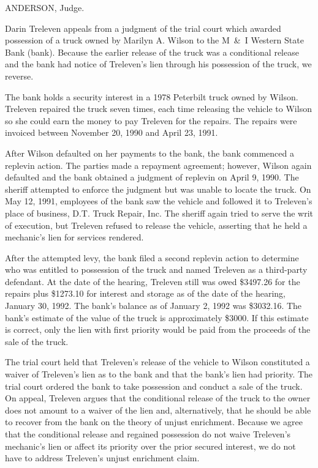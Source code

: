 
ANDERSON, Judge.

Darin Treleven appeals from a judgment of the trial court which awarded
possession of a truck owned by Marilyn A. Wilson to the M~\&~I Western State
Bank (bank). Because the earlier release of the truck was a conditional release
and the bank had notice of Treleven's lien through his possession of the truck,
we reverse.

The bank holds a security interest in a 1978 Peterbilt truck owned by Wilson.
Treleven repaired the truck seven times, each time releasing the vehicle to
Wilson so she could earn the money to pay Treleven for the repairs. The repairs
were invoiced between November 20, 1990 and April 23, 1991.

After Wilson defaulted on her payments to the bank, the bank commenced a
replevin action. The parties made a repayment agreement; however, Wilson again
defaulted and the bank obtained a judgment of replevin on April 9, 1990. The
sheriff attempted to enforce the judgment but was unable to locate the truck.
On May 12, 1991, employees of the bank saw the vehicle and followed it to
Treleven's place of business, D.T. Truck Repair, Inc. The sheriff again tried
to serve the writ of execution, but Treleven refused to release the vehicle,
asserting that he held a mechanic's lien for services rendered.

After the attempted levy, the bank filed a second replevin action to determine
who was entitled to possession of the truck and named Treleven as a third-party
defendant. At the date of the hearing, Treleven still was owed \$3497.26 for
the repairs plus \$1273.10 for interest and storage as of the date of the
hearing, January 30, 1992. The bank's balance as of January 2, 1992 was
\$3032.16. The bank's estimate of the value of the truck is approximately
\$3000. If this estimate is correct, only the lien with first priority would be
paid from the proceeds of the sale of the truck.

The trial court held that Treleven's release of the vehicle to Wilson
constituted a waiver of Treleven's lien as to the bank and that the bank's lien
had priority. The trial court ordered the bank to take possession and conduct a
sale of the truck. On appeal, Treleven argues that the conditional release of
the truck to the owner does not amount to a waiver of the lien and,
alternatively, that he should be able to recover from the bank on the theory of
unjust enrichment. Because we agree that the conditional release and regained
possession do not waive Treleven's mechanic's lien or affect its priority over
the prior secured interest, we do not have to address Treleven's unjust
enrichment claim.

